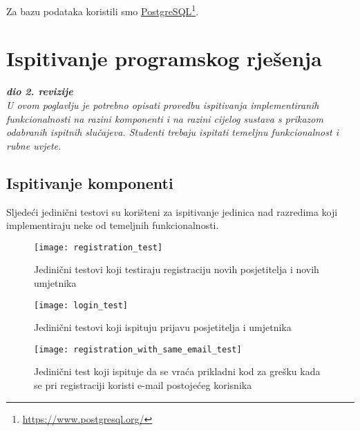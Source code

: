 {			Za bazu podataka koristili smo \underline{PostgreSQL}\footnote{\url{https://www.postgresql.org/}}.
			
			\eject 
		
	
		\section{Ispitivanje programskog rješenja}
			
			\textbf{\textit{dio 2. revizije}}\\
			
			\textit{U ovom poglavlju je potrebno opisati provedbu ispitivanja implementiranih funkcionalnosti na razini komponenti i na razini cijelog sustava s prikazom odabranih ispitnih slučajeva. Studenti trebaju ispitati temeljnu funkcionalnost i rubne uvjete.}
			
			
			
			
			\subsection{Ispitivanje komponenti}

			{Sljedeći jedinični testovi su korišteni za ispitivanje jedinica nad razredima koji implementiraju neke od temeljnih funkcionalnosti.}
				\begin{figure}[H]
				
				\texttt{[image: registration\_test]}
				\caption{Jedinični testovi koji testiraju registraciju novih posjetitelja i novih umjetnika}
				
				\end{figure}
			
				\begin{figure}[H]
					
					\texttt{[image: login\_test]}
					\caption{Jedinični testovi koji ispituju prijavu posjetitelja i umjetnika}
					
				\end{figure}
			
				\begin{figure}[H]
				
				\texttt{[image: registration\_with\_same\_email\_test]}
				\caption{Jedinični test koji ispituje da se vraća prikladni kod za grešku kada se pri registraciji koristi e-mail postojećeg korisnika}
				
				\end{figure}
			
}
